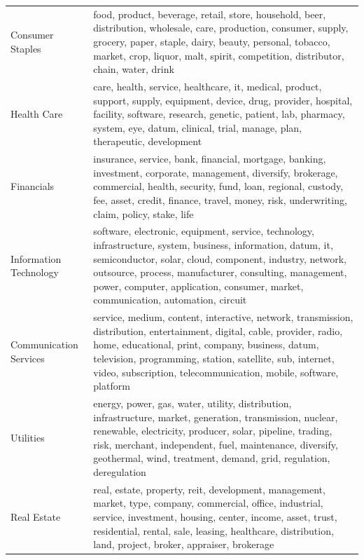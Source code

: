 \begin{longtable}{@{}p{2.5cm} | p{12.6cm}@{}}
Consumer $\ $ Staples
& food, product, beverage, retail, store, household, beer, distribution, wholesale, care, production, consumer, supply, grocery, paper, staple, dairy, beauty, personal, tobacco, market, crop, liquor, malt, spirit, competition, distributor, chain, water, drink \\

Health Care
& care, health, service, healthcare, it, medical, product, support, supply, equipment, device, drug, provider, hospital, facility, software, research, genetic, patient, lab, pharmacy, system, eye, datum, clinical, trial, manage, plan, therapeutic, development \\

Financials
& insurance, service, bank, financial, mortgage, banking, investment, corporate, management, diversify, brokerage, commercial, health, security, fund, loan, regional, custody, fee, asset, credit, finance, travel, money, risk, underwriting, claim, policy, stake, life \\

Information Technology
& software, electronic, equipment, service, technology, infrastructure, system, business, information, datum, it, semiconductor, solar, cloud, component, industry, network, outsource, process, manufacturer, consulting, management, power, computer, application, consumer, market, communication, automation, circuit \\

Communication Services
& service, medium, content, interactive, network, transmission, distribution, entertainment, digital, cable, provider, radio, home, educational, print, company, business, datum, television, programming, station, satellite, sub, internet, video, subscription, telecommunication, mobile, software, platform \\

Utilities
& energy, power, gas, water, utility, distribution, infrastructure, market, generation, transmission, nuclear, renewable, electricity, producer, solar, pipeline, trading, risk, merchant, independent, fuel, maintenance, diversify, geothermal, wind, treatment, demand, grid, regulation, deregulation \\

Real Estate
& real, estate, property, reit, development, management, market, type, company, commercial, office, industrial, service, investment, housing, center, income, asset, trust, residential, rental, sale, leasing, healthcare, distribution, land, project, broker, appraiser, brokerage \\

\bottomrule
\end{longtable}



